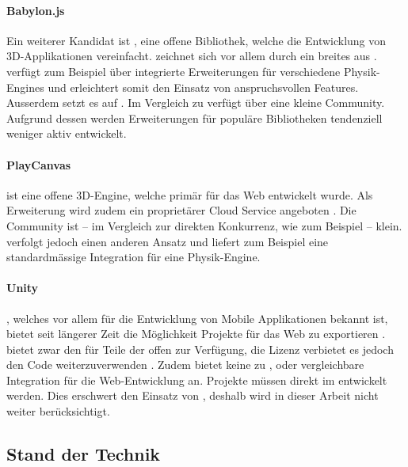 \paragraph{Babylon.js}
Ein weiterer Kandidat ist , eine offene Bibliothek, welche die Entwicklung von 3D-Applikationen vereinfacht.  zeichnet sich vor allem durch ein breites  aus \cite{babylonjsNpmPackage}.  verfügt zum Beispiel über integrierte Erweiterungen für verschiedene Physik-Engines und erleichtert somit den Einsatz von anspruchsvollen Features. Ausserdem setzt es auf .
Im Vergleich zu  verfügt  über eine kleine Community. Aufgrund dessen werden Erweiterungen für populäre Bibliotheken tendenziell weniger aktiv entwickelt.

\paragraph{PlayCanvas}
 ist eine offene 3D-Engine, welche primär für das Web entwickelt wurde. Als Erweiterung wird zudem ein proprietärer Cloud Service angeboten \cite{playcanvasNpmPackage}. Die Community ist – im Vergleich zur direkten Konkurrenz, wie zum Beispiel  – klein.  verfolgt jedoch einen anderen Ansatz und liefert zum Beispiel eine standardmässige Integration für eine Physik-Engine.

\paragraph{Unity}
, welches vor allem für die Entwicklung von Mobile Applikationen bekannt ist, bietet seit längerer Zeit die Möglichkeit Projekte für das Web zu exportieren \cite{unityWeb}.
 bietet zwar den  für Teile der  offen zur Verfügung, die Lizenz verbietet es jedoch den Code weiterzuverwenden \cite{unityOpenSource}.
Zudem bietet  keine zu ,  oder  vergleichbare Integration für die Web-Entwicklung an.  Projekte müssen direkt im  entwickelt werden. Dies erschwert den Einsatz von , deshalb wird   in dieser Arbeit nicht weiter berücksichtigt.

\subsection{Stand der Technik}

